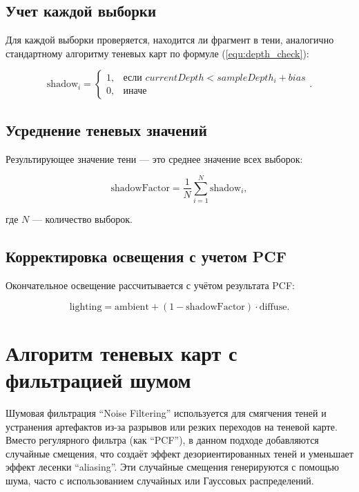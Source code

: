 \subsection*{Учет каждой выборки}

Для каждой выборки проверяется, находится ли фрагмент в тени,
аналогично стандартному алгоритму теневых карт по формуле (\ref{equ:depth_check}):

\begin{equation}
    \label{equ:depth_check_pcf}
    \text{shadow}_i = 
    \begin{cases}
        1, & \text{если $currentDepth < sampleDepth_i + bias$} \\
        0, & \text{иначе}
    \end{cases}
    .
\end{equation}

\subsection*{Усреднение теневых значений}

Результирующее значение тени — это среднее значение всех выборок:

\begin{equation}
    \label{equ:aver_factor_pcf}
    \text{shadowFactor} = \frac{1}{N} \sum_{i=1}^{N} \text{shadow}_i,
\end{equation}

\noindent где \(N\) — количество выборок.

\subsection*{Корректировка освещения с учетом PCF}

Окончательное освещение рассчитывается с учётом результата PCF:

\begin{equation}
    \label{equ:pcf_lambert}
    \text{lighting} = \text{ambient} + (1 - \text{shadowFactor}) \cdot \text{diffuse}.
\end{equation}

\section{Алгоритм теневых карт с фильтрацией шумом}

Шумовая фильтрация \enquote{Noise Filtering} используется для смягчения теней и
устранения артефактов из-за разрывов или резких переходов на теневой карте.
Вместо регулярного фильтра (как \enquote{PCF}), в данном подходе добавляются случайные смещения,
что создаёт эффект дезориентированных теней и уменьшает эффект лесенки \enquote{aliasing}.
Эти случайные смещения генерируются с помощью шума, часто с использованием случайных или Гауссовых распределений.

